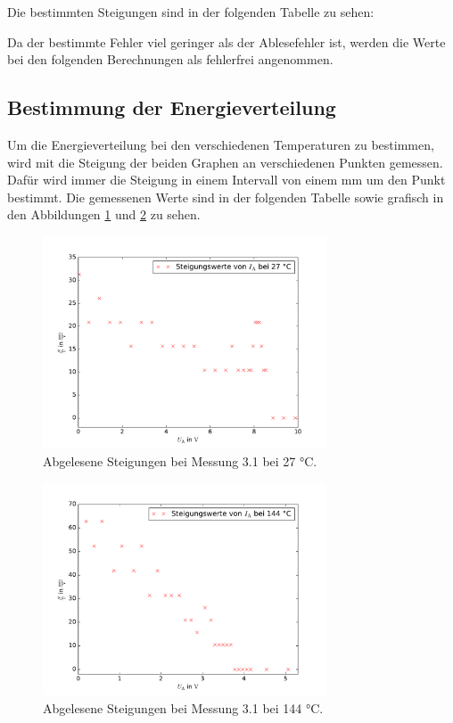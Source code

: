 

Die bestimmten Steigungen sind in der folgenden Tabelle zu sehen:



Da der bestimmte Fehler viel geringer als der Ablesefehler ist, werden die Werte
bei den folgenden Berechnungen als fehlerfrei angenommen.


\subsection{Bestimmung der Energieverteilung}

Um die Energieverteilung bei den verschiedenen Temperaturen zu bestimmen, wird mit
die Steigung der beiden Graphen an verschiedenen Punkten gemessen. Dafür wird immer
die Steigung in einem Intervall von einem mm um den Punkt bestimmt. Die gemessenen
Werte sind in der folgenden Tabelle sowie grafisch in den Abbildungen
\ref{fig:Messung_A_27} und \ref{fig:Messung_A_144} zu sehen.



\begin{figure}
  \centering
  \includegraphics[width = 0.75\textwidth]{Pics/Messung_A_27.pdf}
  \caption{Abgelesene Steigungen bei Messung 3.1 bei 27 °C.}
  \label{fig:Messung_A_27}
\end{figure}

\begin{figure}
  \centering
  \includegraphics[width = 0.75\textwidth]{Pics/Messung_A_144.pdf}
  \caption{Abgelesene Steigungen bei Messung 3.1 bei 144 °C.}
  \label{fig:Messung_A_144}
\end{figure}

